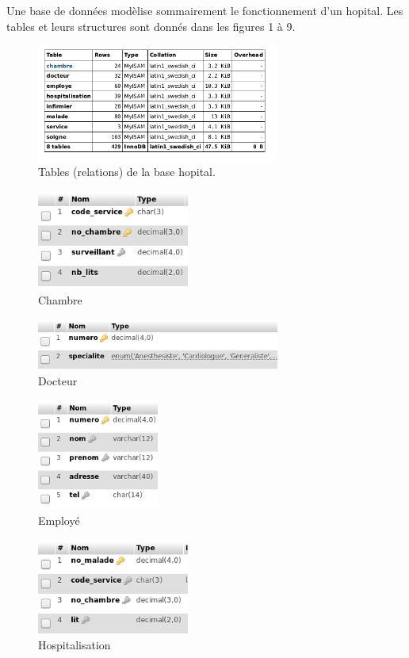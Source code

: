 Une base de données modèlise sommairement le fonctionnement d'un hopital. Les tables et leurs structures sont donnés dans les figures 1 à 9.
\begin{figure}[h]
  \centering
  \includegraphics[width=8cm]{./Ehopital_1.png}
  \caption{Tables (relations) de la base \og hopital\fg.}
  \label{fig:hop_1}
\end{figure}
\begin{figure}
 \centering
 \includegraphics[width=5cm]{./Ehopital_2.png}
 \caption{Chambre}
 \label{fig:hop_2}
\end{figure}
\begin{figure}
 \centering
 \includegraphics[width=8cm]{./Ehopital_3.png}
 \caption{Docteur}
 \label{fig:hop_3}
\end{figure}
\begin{figure}
 \centering
 \includegraphics[width=4cm]{./Ehopital_4.png}
 \caption{Employé}
 \label{fig:hop_4}
\end{figure}
\begin{figure}
 \centering
 \includegraphics[width=5cm]{./Ehopital_5.png}
 \caption{Hospitalisation}
 \label{fig:hop_5}
\end{figure}
